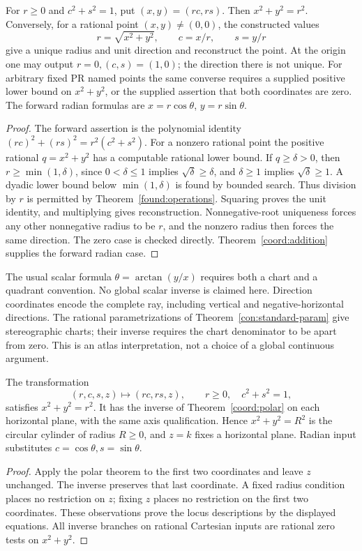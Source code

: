 \begin{theorem}
\label{coord:polar}
For $r\ge0$ and $c^2+s^2=1$, put $(x,y)=(rc,rs)$. Then
$x^2+y^2=r^2$. Conversely, for a rational point $(x,y)\ne(0,0)$, the
constructed values
\[
 r=\sqrt{x^2+y^2},\qquad c=x/r,\qquad s=y/r
\]
give a unique radius and unit direction and reconstruct the point. At
the origin one may output $r=0,(c,s)=(1,0)$; the direction there is not
unique. For arbitrary fixed PR named points the same converse requires
a supplied positive lower bound on $x^2+y^2$, or the supplied assertion
that both coordinates are zero. The forward radian formulas are
$x=r\cos\theta$, $y=r\sin\theta$.
\end{theorem}
\begin{proof}
The forward assertion is the polynomial identity
$(rc)^2+(rs)^2=r^2(c^2+s^2)$. For a nonzero rational point the positive
rational $q=x^2+y^2$ has a computable rational lower bound. If
$q\ge\delta>0$, then $r\ge\min(1,\delta)$, since
$0<\delta\le1$ implies $\sqrt\delta\ge\delta$, and
$\delta\ge1$ implies $\sqrt\delta\ge1$. A dyadic lower bound below
$\min(1,\delta)$ is found by bounded search. Thus division by $r$ is
permitted by Theorem~\ref{found:operations}. Squaring proves the unit
identity, and multiplying gives reconstruction. Nonnegative-root
uniqueness forces any other nonnegative radius to be $r$, and the
nonzero radius then forces the same direction. The zero case is checked
directly. Theorem~\ref{coord:addition} supplies the forward radian case.
\end{proof}

The usual scalar formula $\theta=\arctan(y/x)$ requires both a chart and
a quadrant convention. No global scalar inverse is claimed here.
Direction coordinates encode the complete ray, including vertical and
negative-horizontal directions. The rational parametrizations of
Theorem~\ref{con:standard-param} give stereographic charts; their inverse
requires the chart denominator to be apart from zero. This is an atlas
interpretation, not a choice of a global continuous argument.

\begin{theorem}
\label{coord:cylindrical}
The transformation
\[
 (r,c,s,z)\longmapsto(rc,rs,z),\qquad r\ge0,\quad c^2+s^2=1,
\]
satisfies $x^2+y^2=r^2$. It has the inverse of
Theorem~\ref{coord:polar} on each horizontal plane, with the same axis
qualification. Hence $x^2+y^2=R^2$ is the circular cylinder of radius
$R\ge0$, and $z=k$ fixes a horizontal plane. Radian input substitutes
$c=\cos\theta,s=\sin\theta$.
\end{theorem}
\begin{proof}
Apply the polar theorem to the first two coordinates and leave $z$
unchanged. The inverse preserves that last coordinate. A fixed radius
condition places no restriction on $z$; fixing $z$ places no restriction
on the first two coordinates. These observations prove the locus
descriptions by the displayed equations. All inverse branches on
rational Cartesian inputs are rational zero tests on $x^2+y^2$.
\end{proof}

